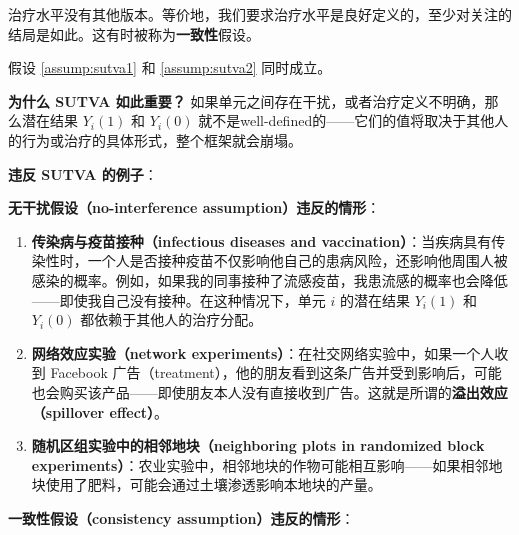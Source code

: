 \begin{Assumption}[一致性]\label{assump:sutva2}
治疗水平没有其他版本。等价地，我们要求治疗水平是良好定义的，至少对关注的结局是如此。这有时被称为\textbf{一致性}假设。
\end{Assumption}

\begin{Assumption}[SUTVA]\label{assump:sutva-complete}
假设 \ref{assump:sutva1} 和 \ref{assump:sutva2} 同时成立。
\end{Assumption}

\textbf{为什么 SUTVA 如此重要？} 如果单元之间存在干扰，或者治疗定义不明确，那么潜在结果 $Y_i(1)$ 和 $Y_i(0)$ 就不是well-defined的——它们的值将取决于其他人的行为或治疗的具体形式，整个框架就会崩塌。

\textbf{违反 SUTVA 的例子}：

\textbf{无干扰假设（no-interference assumption）违反的情形}：

\begin{enumerate}
  \item \textbf{传染病与疫苗接种（infectious diseases and vaccination）}：当疾病具有传染性时，一个人是否接种疫苗不仅影响他自己的患病风险，还影响他周围人被感染的概率。例如，如果我的同事接种了流感疫苗，我患流感的概率也会降低——即使我自己没有接种。在这种情况下，单元 $i$ 的潜在结果 $Y_i(1)$ 和 $Y_i(0)$ 都依赖于其他人的治疗分配。

  \item \textbf{网络效应实验（network experiments）}：在社交网络实验中，如果一个人收到 Facebook 广告（treatment），他的朋友看到这条广告并受到影响后，可能也会购买该产品——即使朋友本人没有直接收到广告。这就是所谓的\textbf{溢出效应（spillover effect）}。

  \item \textbf{随机区组实验中的相邻地块（neighboring plots in randomized block experiments）}：农业实验中，相邻地块的作物可能相互影响——如果相邻地块使用了肥料，可能会通过土壤渗透影响本地块的产量。
\end{enumerate}

\textbf{一致性假设（consistency assumption）违反的情形}：

